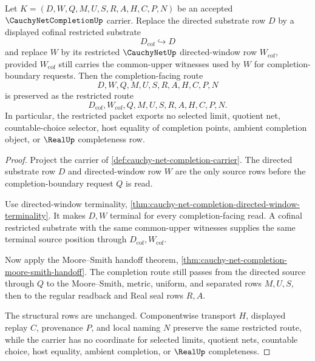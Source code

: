\begin{theorem}
\label{thm:cauchy-net-completion-directed-window-cofinal-restriction}
Let $K=(D,W,Q,M,U,S,R,A,H,C,P,N)$ be an accepted $\CauchyNetCompletionUp$ carrier. Replace the directed substrate row $D$ by a displayed cofinal restricted substrate
$$
D_{\mathrm{cof}}\hookrightarrow D
$$
and replace $W$ by its restricted $\CauchyNetUp$ directed-window row $W_{\mathrm{cof}}$, provided $W_{\mathrm{cof}}$ still carries the common-upper witnesses used by $W$ for completion-boundary requests. Then the completion-facing route
$$
D,W,Q,M,U,S,R,A,H,C,P,N
$$
is preserved as the restricted route
$$
D_{\mathrm{cof}},W_{\mathrm{cof}},Q,M,U,S,R,A,H,C,P,N .
$$
In particular, the restricted packet exports no selected limit, quotient net, countable-choice selector, host equality of completion points, ambient completion object, or $\RealUp$ completeness row.
\end{theorem}
\begin{proof}
Project the carrier of \autoref{def:cauchy-net-completion-carrier}. The directed substrate row $D$ and directed-window row $W$ are the only source rows before the completion-boundary request $Q$ is read.

Use directed-window terminality, \autoref{thm:cauchy-net-completion-directed-window-terminality}. It makes $D,W$ terminal for every completion-facing read. A cofinal restricted substrate with the same common-upper witnesses supplies the same terminal source position through $D_{\mathrm{cof}},W_{\mathrm{cof}}$.

Now apply the Moore--Smith handoff theorem, \autoref{thm:cauchy-net-completion-moore-smith-handoff}. The completion route still passes from the directed source through $Q$ to the Moore--Smith, metric, uniform, and separated rows $M,U,S$, then to the regular readback and Real seal rows $R,A$.

The structural rows are unchanged. Componentwise transport $H$, displayed replay $C$, provenance $P$, and local naming $N$ preserve the same restricted route, while the carrier has no coordinate for selected limits, quotient nets, countable choice, host equality, ambient completion, or $\RealUp$ completeness.
\end{proof}

